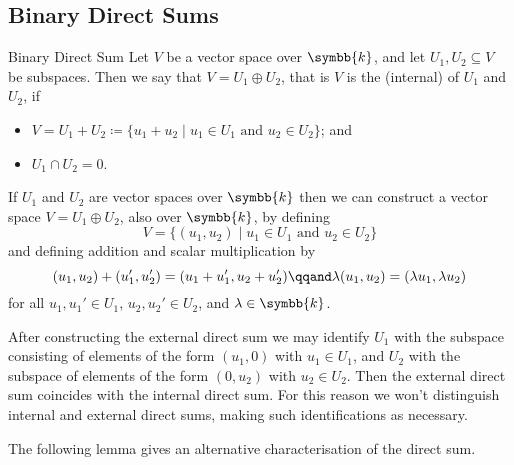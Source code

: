 \documentclass[fleqn]{NotesClass}
\renewcommand{\field}{\symbb{k}}
\begin{document}
	\subsection{Binary Direct Sums}
	\begin{dfn}{Binary Direct Sum}{}
		Let \(V\) be a vector space over \(\field\), and let \(U_1, U_2 \subseteq V\) be subspaces.
		Then we say that \(V = U_1 \oplus U_2\), that is \(V\) is the (internal)  of \(U_1\) and \(U_2\), if
		\begin{itemize}
			\item \(V = U_1 + U_2 \coloneq \{u_1 + u_2 \mid u_1 \in U_1 \text{ and } u_2 \in U_2\}\); and
			\item \(U_1 \cap U_2 = 0\).
		\end{itemize}
		
		If \(U_1\) and \(U_2\) are vector spaces over \(\field\) then we can construct a vector space \(V = U_1 \oplus U_2\), also over \(\field\), by defining
		\begin{equation}
			V = \{(u_1, u_2) \mid u_1 \in U_1 \text{ and } u_2 \in U_2\}
		\end{equation}
		and defining addition and scalar multiplication by
		\begin{equation}
			(u_1, u_2) + (u_1', u_2') = (u_1 + u_1', u_2 + u_2') \qqand \lambda (u_1, u_2) = (\lambda u_1, \lambda u_2)
		\end{equation}
        for all \(u_1, u_1' \in U_1\), \(u_2, u_2' \in U_2\), and \(\lambda \in \field\).
	\end{dfn}
	
    After constructing the external direct sum we may identify \(U_1\) with the subspace consisting of elements of the form \((u_1, 0)\) with \(u_1 \in U_1\), and \(U_2\) with the subspace of elements of the form \((0, u_2)\) with \(u_2 \in U_2\).
    Then the external direct sum coincides with the internal direct sum.
    For this reason we won't distinguish internal and external direct sums, making such identifications as necessary.
    
    The following lemma gives an alternative characterisation of the direct sum.
    
\end{document}
